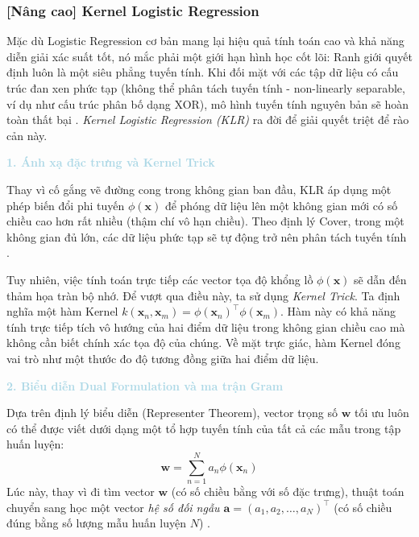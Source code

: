 \subsubsection{[Nâng cao] Kernel Logistic Regression}

Mặc dù Logistic Regression cơ bản mang lại hiệu quả tính toán cao và khả năng diễn giải xác suất tốt, nó mắc phải một giới hạn hình học cốt lõi: Ranh giới quyết định luôn là một siêu phẳng tuyến tính. Khi đối mặt với các tập dữ liệu có cấu trúc đan xen phức tạp (không thể phân tách tuyến tính - non-linearly separable, ví dụ như cấu trúc phân bố dạng XOR), mô hình tuyến tính nguyên bản sẽ hoàn toàn thất bại \cite{bishop2006pattern}. \textit{Kernel Logistic Regression (KLR)} ra đời để giải quyết triệt để rào cản này.

\vspace{0.5em}
\noindent\textcolor{lightblue}{\textbf{1. Ánh xạ đặc trưng và Kernel Trick}}
\vspace{0.5em}

Thay vì cố gắng vẽ đường cong trong không gian ban đầu, KLR áp dụng một phép biến đổi phi tuyến $\phi(\mathbf{x})$ để phóng dữ liệu lên một không gian mới có số chiều cao hơn rất nhiều (thậm chí vô hạn chiều). Theo định lý Cover, trong một không gian đủ lớn, các dữ liệu phức tạp sẽ tự động trở nên phân tách tuyến tính \cite{goodfellow2016deep}.

Tuy nhiên, việc tính toán trực tiếp các vector tọa độ khổng lồ $\phi(\mathbf{x})$ sẽ dẫn đến thảm họa tràn bộ nhớ. Để vượt qua điều này, ta sử dụng \textit{Kernel Trick}. Ta định nghĩa một hàm Kernel $k(\mathbf{x}_n, \mathbf{x}_m) = \phi(\mathbf{x}_n)^\top \phi(\mathbf{x}_m)$. Hàm này có khả năng tính trực tiếp tích vô hướng của hai điểm dữ liệu trong không gian chiều cao mà không cần biết chính xác tọa độ của chúng. Về mặt trực giác, hàm Kernel đóng vai trò như một thước đo độ tương đồng giữa hai điểm dữ liệu.

\vspace{0.5em}
\noindent\textcolor{lightblue}{\textbf{2. Biểu diễn Dual Formulation và ma trận Gram}}
\vspace{0.5em}

Dựa trên định lý biểu diễn (Representer Theorem), vector trọng số $\mathbf{w}$ tối ưu luôn có thể được viết dưới dạng một tổ hợp tuyến tính của tất cả các mẫu trong tập huấn luyện:
\begin{equation}
    \mathbf{w} = \sum_{n=1}^N a_n \phi(\mathbf{x}_n)
\end{equation}
Lúc này, thay vì đi tìm vector $\mathbf{w}$ (có số chiều bằng với số đặc trưng), thuật toán chuyển sang học một vector \textit{hệ số đối ngẫu $\mathbf{a} = (a_1, a_2, \dots, a_N)^\top$} (có số chiều đúng bằng số lượng mẫu huấn luyện $N$) \cite{bishop2006pattern}.

